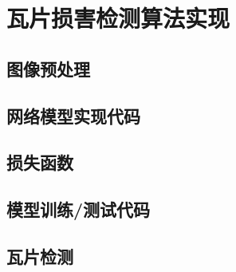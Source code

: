 \section{瓦片损害检测算法实现}
\setcounter{figure}{0}

\subsection{图像预处理}

\subsection{网络模型实现代码}

\subsection{损失函数}

\subsection{模型训练/测试代码}

\subsection{瓦片检测}
